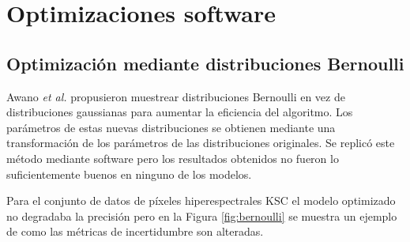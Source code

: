 
\chapter{Optimizaciones software}

\section{Optimización mediante distribuciones Bernoulli}

Awano \emph{et al.} \cite{bnn_clt_approx} propusieron muestrear distribuciones Bernoulli en vez de distribuciones gaussianas para aumentar la eficiencia del algoritmo. Los parámetros de estas nuevas distribuciones se obtienen mediante una transformación de los parámetros de las distribuciones originales. Se replicó este método mediante software pero los resultados obtenidos no fueron lo suficientemente buenos en ninguno de los modelos. 

Para el conjunto de datos de píxeles hiperespectrales KSC el modelo optimizado no degradaba la precisión pero en la Figura \ref{fig:bernoulli} se muestra un ejemplo de como las métricas de incertidumbre son alteradas.

